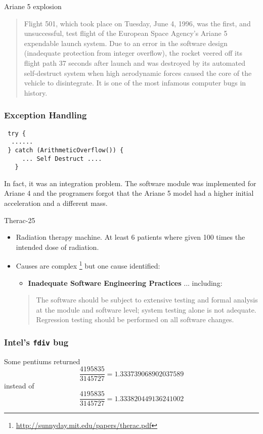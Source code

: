 \documentclass[handout]{beamer}
\begin{document}
\begin{frame}{Ariane 5 explosion}
  \begin{quote}
    Flight 501, which took place on Tuesday, June 4, 1996, was the
    first, and unsuccessful, test flight of the European Space
    Agency's Ariane 5 expendable launch system. Due to an error in the
    software design (inadequate protection from integer overflow), the
    rocket veered off its flight path 37 seconds after launch and was
    destroyed by its automated self-destruct system when high
    aerodynamic forces caused the core of the vehicle to
    disintegrate. It is one of the most infamous computer bugs in
    history.
  \end{quote}
\end{frame}
\begin{frame}[fragile]
  \frametitle{Exception Handling}
\begin{lstlisting}
 try {
  ......
 } catch (ArithmeticOverflow()) {
     ... Self Destruct .... 
   } 
\end{lstlisting}
In fact, it was an integration problem. The software module was implemented for
Ariane 4 and the programers  forgot that the Ariane 5 model had a higher initial
acceleration and a different mass.  
\end{frame}
\begin{frame}{Therac-25}
  \begin{itemize}
  \item  Radiation therapy machine. At least 6 patients where given
    100 times the intended dose of radiation. 
  \item Causes are complex
    \footnote{\url{http://sunnyday.mit.edu/papers/therac.pdf}} but one
    cause identified:
    \begin{itemize}
    \item      {\bf Inadequate Software Engineering Practices} ... including:
    \end{itemize}
    \begin{quote}
     The software should be subject to extensive testing and formal
     analysis at the module and software level; system testing alone
     is not adequate.  Regression testing should be performed on all
     software changes. 
    \end{quote}
  \end{itemize}  
\end{frame}
\begin{frame}
  \frametitle{Intel's {\tt fdiv} bug}
   
Some pentiums returned
\[
\frac{4195835}{3145727} = 1.333739068902037589
\]
instead of 
\[
\frac{4195835}{3145727} = 1.333820449136241002
\]

\end{frame}
\end{document}
